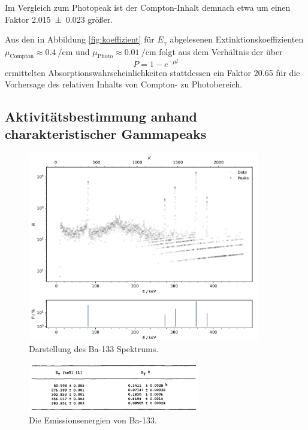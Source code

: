 Im Vergleich zum Photopeak ist der Compton-Inhalt demnach etwa um einen Faktor \num{2.015 +- 0.023} größer.

Aus den in Abbildung \ref{fig:koeffizient} für $E_\gamma$ abgelesenen Extinktionskoeffizienten
$\mu_\text{Compton} \approx \qty{0.4}{\per\centi\meter}$ und $\mu_\text{Photo} \approx \qty{0.01}{\per\centi\meter}$ 
folgt aus dem Verhältnis der über
\begin{equation*}
    P = 1 - e^{- \mu l}
\end{equation*}
ermittelten Absorptionswahrscheinlichkeiten stattdessen ein Faktor \num{20.65} für die Vorhersage des relativen Inhalts von
Compton- zu Photobereich.

\subsection{Aktivitätsbestimmung anhand charakteristischer Gammapeaks}

\begin{figure}[H]
    \centering
    \includegraphics[width=0.9\textwidth]{content/plots/plot10.jpg}
    \caption{Darstellung des Ba-133 Spektrums.}
    \label{fig:plot10}
\end{figure}

\begin{figure}[H]
    \centering
    \includegraphics[width=0.666\textwidth]{content/grafik/baenergien.jpg}
    \caption{Die Emissionsenergien von Ba-133. \cite{Kalibration}}
    \label{fig:baE}
\end{figure}

